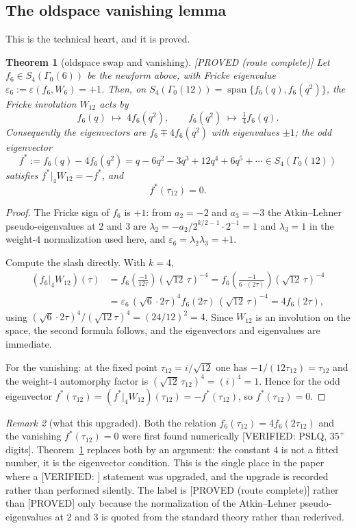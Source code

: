 \documentclass[11pt,reqno]{amsart}
\theoremstyle{plain}
\newtheorem{theorem}{Theorem}[section]
\theoremstyle{definition}
\theoremstyle{remark}
\newtheorem{remark}[theorem]{Remark}
\newcommand{\fs}{f^{*}}
\newcommand{\Proved}{\textup{\textsf{[PROVED]}}}
\newcommand{\ProvedS}{\textup{\textsf{[PROVED (route complete)]}}}
\newcommand{\VerifiedR}[1]{\textup{\textsf{[VERIFIED: #1]}}}
\begin{document}
\subsection{The oldspace vanishing lemma}
This is the technical heart, and it is proved.

\begin{theorem}[oldspace swap and vanishing]\label{thm:oldspace}
\ProvedS{} Let $f_6\in S_4(\Gamma_0(6))$ be the newform above, with Fricke
eigenvalue $\varepsilon_6:=\varepsilon(f_6,W_6)=+1$. Then, on
$S_4(\Gamma_0(12))=\operatorname{span}\{f_6(q),f_6(q^2)\}$, the Fricke
involution $W_{12}$ acts by
\[
f_6(q)\;\longmapsto\;4f_6(q^2),\qquad
f_6(q^2)\;\longmapsto\;\tfrac14f_6(q).
\]
Consequently the eigenvectors are $f_6\mp4f_6(q^2)$ with eigenvalues
$\pm1$; the odd eigenvector
\[
\fs:=f_6(q)-4f_6(q^2)=q-6q^2-3q^3+12q^4+6q^5+\cdots\in S_4(\Gamma_0(12))
\]
satisfies $\fs|_4W_{12}=-\fs$, and
\[
\fs(\tau_{12})=0 .
\]
\end{theorem}

\begin{proof}
The Fricke sign of $f_6$ is $+1$: from $a_2=-2$ and $a_3=-3$ the
Atkin--Lehner pseudo-eigenvalues at $2$ and $3$ are
$\lambda_2=-a_2/2^{k/2-1}\!\cdot\!2^{-1}=1$ and $\lambda_3=1$ in the
weight-$4$ normalization used here, and $\varepsilon_6=\lambda_2\lambda_3
=+1$.

Compute the slash directly. With $k=4$,
\begin{align*}
(f_6|_4W_{12})(\tau)
&=f_6\!\left(\frac{-1}{12\tau}\right)(\sqrt{12}\,\tau)^{-4}
 =f_6\!\left(\frac{-1}{6\cdot(2\tau)}\right)(\sqrt{12}\,\tau)^{-4}\\
&=\varepsilon_6\,(\sqrt6\cdot2\tau)^4f_6(2\tau)\,(\sqrt{12}\,\tau)^{-4}
 =4f_6(2\tau),
\end{align*}
using $(\sqrt6\cdot2\tau)^4/(\sqrt{12}\tau)^4=(24/12)^2=4$. Since $W_{12}$
is an involution on the space, the second formula follows, and the
eigenvectors and eigenvalues are immediate.

For the vanishing: at the fixed point $\tau_{12}=i/\sqrt{12}$ one has
$-1/(12\tau_{12})=\tau_{12}$ and the weight-$4$ automorphy factor is
$(\sqrt{12}\,\tau_{12})^4=(i)^4=1$. Hence for the odd eigenvector
$\fs(\tau_{12})=(\fs|_4W_{12})(\tau_{12})=-\fs(\tau_{12})$, so
$\fs(\tau_{12})=0$.
\end{proof}

\begin{remark}[what this upgraded]
Both the relation $f_6(\tau_{12})=4f_6(2\tau_{12})$ and the vanishing
$\fs(\tau_{12})=0$ were first found numerically \VerifiedR{PSLQ, $35^+$
digits}. Theorem~\ref{thm:oldspace} replaces both by an argument: the
constant $4$ is not a fitted number, it is the eigenvector condition. This
is the single place in the paper where a \VerifiedR{} statement was
upgraded, and the upgrade is recorded rather than performed silently. The
label is \ProvedS{} rather than \Proved{} only because the normalization of
the Atkin--Lehner pseudo-eigenvalues at $2$ and $3$ is quoted from the
standard theory rather than rederived.
\end{remark}
\end{document}
